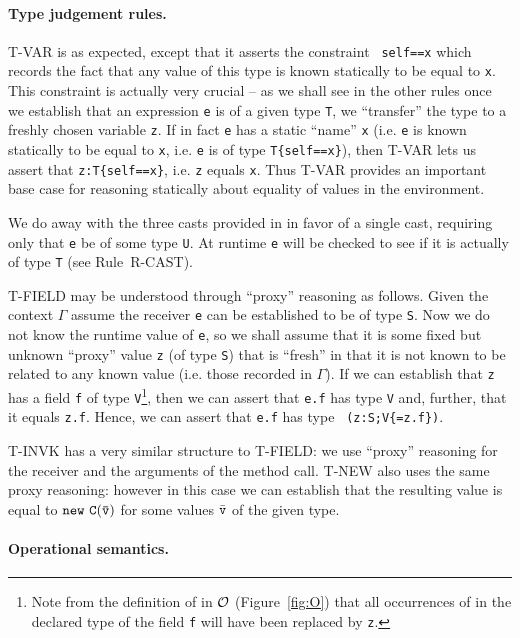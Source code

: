 \paragraph{Type judgement rules.}
{\sc T-VAR} is as expected, except that it asserts the constraint {\tt
self==x} which records the fact that any value of this type is known
statically to be equal to {\tt x}. This constraint is actually very
crucial -- as we shall see in the other rules once we establish that
an expression {\tt e} is of a given type {\tt T}, we ``transfer'' the
type to a freshly chosen variable {\tt z}. If in fact {\tt e} has a
static ``name'' {\tt x} (i.e.{} {\tt e} is known statically to be
equal to {\tt x}, i.e.{} {\tt e} is of type {\tt T\{self==x\}}), then
{\sc T-VAR} lets us assert that {\tt z:T\{self==x\}}, i.e.{} {\tt z}
equals {\tt x}. Thus {\sc T-VAR} provides an important base case for
reasoning statically about equality of values in the environment.

We do away with the three casts provided in\FJ{} in favor of a single
cast, requiring only that {\tt e} be of some type {\tt U}. At runtime
{\tt e} will be checked to see if it is actually of type {\tt T} (see
Rule~{\sc R-CAST}).

{\sc T-FIELD} may be understood through ``proxy'' reasoning as
follows.  Given the context $\Gamma$ assume the receiver {\tt e} can
be established to be of type {\tt S}. Now we do not know the runtime
value of {\tt e}, so we shall assume that it is some fixed but unknown
``proxy'' value {\tt z} (of type {\tt S}) that is ``fresh'' in that it
is not known to be related to any known value (i.e.{} those recorded
in $\Gamma$).  If we can establish that {\tt z} has a field {\tt f} of
type {\tt V}\footnote{Note from the definition of
\fields{} in ${\cal O}$ (Figure~\ref{fig:O}) that all occurrences of
\this{} in the declared type of the field {\tt f} will have been replaced
by {\tt z}.}, then we can assert that
{\tt e.f} has type {\tt V} and, further, that it equals {\tt z.f}.
Hence, we can assert that {\tt e.f} has type {\tt
(z:S;V\{\self=z.f\})}.

{\sc T-INVK} has a very similar structure to {\sc T-FIELD}: we use
``proxy'' reasoning for the receiver and the arguments of the method
call. {\sc T-NEW} also uses the same proxy reasoning: however in this case
we can establish that the resulting value is equal to ${\tt new\ C(\bar{\tt v})}$
for some values $\bar{\tt v}$ of the given type.

\paragraph{Operational semantics.}

